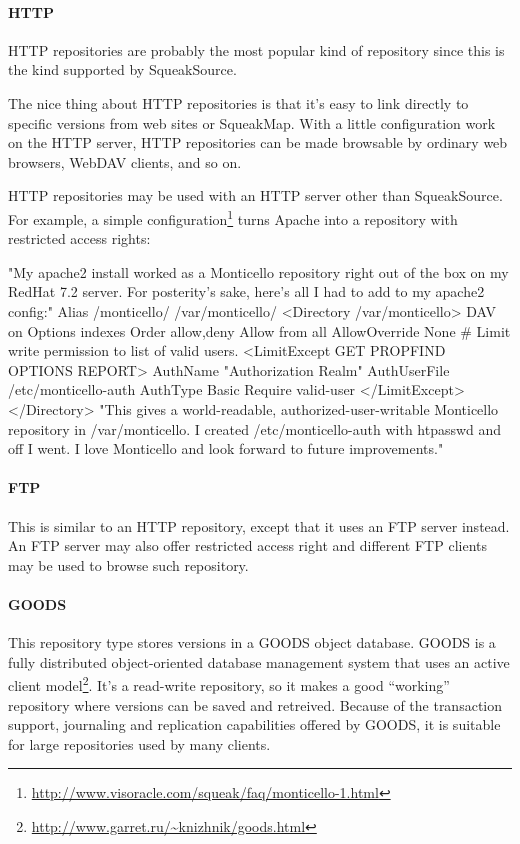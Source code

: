 \documentclass[a4paper,10pt,twoside]{book}
\begin{document}
\paragraph{HTTP} HTTP repositories are probably the most popular kind of repository since this is the kind supported by SqueakSource. %

The nice thing about HTTP repositories is that it's easy to link directly to specific versions from web sites or SqueakMap. With a little configuration work on the HTTP server, HTTP repositories can be made browsable by ordinary web browsers, WebDAV clients, and so on.

HTTP repositories may be used with an HTTP server other than SqueakSource. For example, a simple configuration\footnote{\url{http://www.visoracle.com/squeak/faq/monticello-1.html}} turns Apache into a \MC repository with restricted access rights:

\begin{code}{}
"My apache2 install worked as a Monticello repository right out of the box on my
RedHat 7.2 server.  For posterity's sake, here's all I had to add to my apache2 config:"
Alias /monticello/ /var/monticello/
<Directory /var/monticello>
  DAV on
  Options indexes
  Order allow,deny
  Allow from all
  AllowOverride None
  # Limit write permission to list of valid users.
  <LimitExcept GET PROPFIND OPTIONS REPORT>
    AuthName "Authorization Realm"
    AuthUserFile /etc/monticello-auth
    AuthType Basic
    Require valid-user
  </LimitExcept>
</Directory>
"This gives a world-readable, authorized-user-writable Monticello repository in
/var/monticello.  I created /etc/monticello-auth with htpasswd and off I went.
I love Monticello and look forward to future improvements."
\end{code}

\paragraph{FTP} This is similar to an HTTP repository, except that it uses an FTP server instead. An FTP server may also offer restricted access right and different FTP clients may be used to browse such \MC repository.

\paragraph{GOODS}
This repository type stores versions in a GOODS object database.
GOODS is a fully distributed object-oriented database management system that uses an active client model\footnote{\url{http://www.garret.ru/~knizhnik/goods.html}}.
It's a read-write repository, so it makes a good ``working'' repository where versions can be saved and retreived. Because of the transaction support, journaling and replication capabilities offered by GOODS, it is suitable for large repositories used by many clients.  
\end{document}
